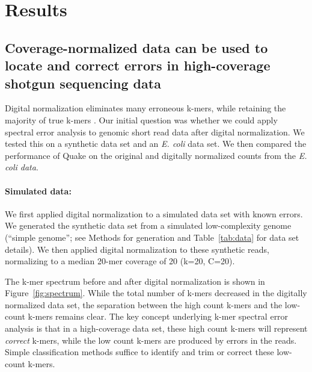 \documentclass{article}
\begin{document}
\section{Results}

\subsection{Coverage-normalized data can be used to locate
and correct errors in high-coverage shotgun sequencing data}

Digital normalization eliminates many erroneous k-mers, while
retaining the majority of true k-mers \cite{Brown2012}.  Our initial
question was whether we could apply spectral error analysis to genomic
short read data after digital normalization.  We tested this on a
synthetic data set and an {\em E. coli} data set.  We then compared
the performance of Quake on the original and digitally normalized
counts from the {\em E. coli data}.

\paragraph{Simulated data:}
We first applied digital normalization to a simulated data set with
known errors.  We generated the synthetic data set from a simulated
low-complexity genome (``simple genome''; see Methods for generation
and Table~\ref{tab:data} for data set details). We then applied
digital normalization to these synthetic reads, normalizing to a
median 20-mer coverage of 20 (k=20, C=20).

The k-mer spectrum before and after digital normalization is shown in
Figure~\ref{fig:spectrum}.  While the total number of k-mers decreased
in the digitally normalized data set, the separation between the high
count k-mers and the low-count k-mers remains clear.  The key concept
underlying k-mer spectral error analysis is that in a high-coverage
data set, these high count k-mers will represent {\em correct} k-mers,
while the low count k-mers are produced by errors in the reads.
Simple classification methods suffice to identify and trim or correct
these low-count k-mers.
\end{document}
